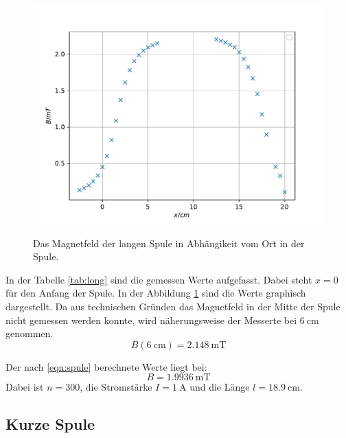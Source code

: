 \begin{figure}
  \centering
  \caption{Das Magnetfeld der langen Spule in Abhängikeit vom Ort in der Spule.}
  \includegraphics[width=\textwidth]{content/data/plot_long.pdf}
  \label{fig:long}
\end{figure}

\FloatBarrier
In der Tabelle \ref{tab:long} sind die gemessen Werte aufgefasst.
Dabei steht $x=0$ für den Anfang der Spule.
In der Abbildung \ref{fig:long} sind die Werte graphisch dargestellt.
Da aus technischen Gründen das Magnetfeld in der Mitte der Spule nicht gemessen werden konnte, wird näherungsweise der Messerte bei $\SI{6}{\centi\meter}$ genommen.
\begin{equation*}
  B(\SI{6}{\centi\meter}) = \SI{2.148}{\milli\tesla} 
\end{equation*}

Der nach \eqref{eqn:spule} berechnete Werte liegt bei:
\begin{equation*}
  B = \SI{1.9936}{\milli\tesla} 
\end{equation*}
Dabei ist $n=300$, die Stromstärke $I=\SI{1}{\ampere}$ und die Länge $l=\SI{18.9}{\centi\meter}$.

\FloatBarrier
\subsection{Kurze Spule}

